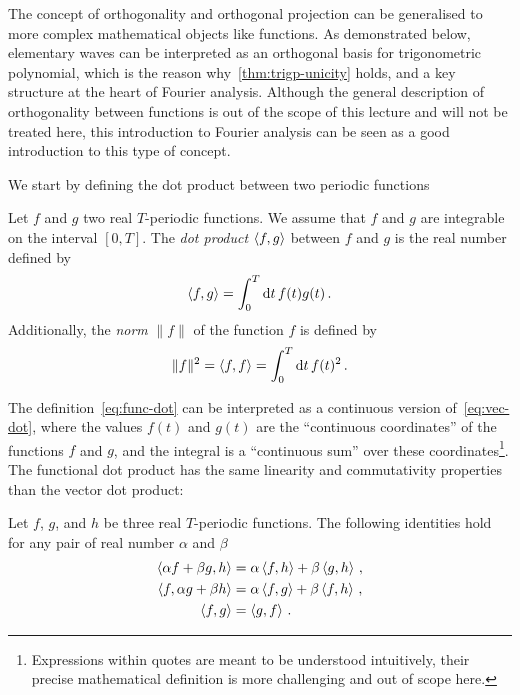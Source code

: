 The concept of orthogonality and orthogonal projection can be generalised to more complex mathematical objects like functions. As demonstrated below, elementary waves can be interpreted as an orthogonal basis for trigonometric polynomial, which is the reason why~\cref{thm:trigp-unicity} holds, and a key structure at the heart of Fourier analysis.
Although the general description of orthogonality between functions is out of the scope of this lecture and will not be treated here, this introduction to Fourier analysis can be seen as a good introduction to this type of concept.

We start by defining the dot product between two periodic functions
\begin{definition}
  Let $f$ and $g$ two real $T$-periodic functions. We assume that $f$ and $g$ are integrable on the
  interval $[0,T]$. The \emph{dot product} $\braket{f,g}$ between $f$ and $g$ is the real number defined by
  \begin{equation}
    \braket{f,g}=\int_{0}^{T}\mathrm{d} t\, f(t)g(t)\,.\label{eq:func-dot}
  \end{equation}
  Additionally, the \emph{norm} $\|f\|$ of the function $f$ is defined by
  \begin{equation}
    \|f\|^2=\braket{f,f}=\int_{0}^{T}\mathrm{d} t\, f(t)^2\,.
  \end{equation}
\end{definition}
The definition~\cref{eq:func-dot} can be interpreted as a continuous version of~\cref{eq:vec-dot}, where the values $f(t)$ and $g(t)$ are the ``continuous coordinates'' of the functions $f$ and $g$, and the integral is a ``continuous sum'' over these coordinates\footnote{Expressions within quotes are meant to be understood intuitively, their precise mathematical definition is more challenging and out of scope here.}. The functional dot product has the same linearity and commutativity properties than the vector dot product:
\begin{proposition}
  Let $f$, $g$, and $h$ be three real $T$-periodic functions. The following identities hold for any pair of real number $\alpha$ and $\beta$
  \begin{align}
    \braket{\alpha f+\beta g,h}&=\alpha\braket{f,h}+\beta\braket{g,h}\,,\\
    \braket{f,\alpha g+\beta h}&=\alpha\braket{f,g}+\beta\braket{f,h}\,,\\
    \braket{f,g}&=\braket{g,f}\,.
  \end{align}
\end{proposition}
